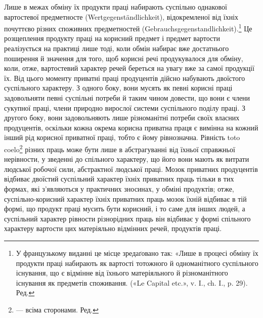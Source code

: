 Лише в межах обміну їх продукти праці набирають суспільно
однакової вартостевої предметносте (Wertgegenständlichkeit), відокремленої
від їхніх почуттєво різних споживних предметностей
(Gebrauchsgegenstandlichkeit).\footnote*{
У французькому виданні це місце зредаґовано так: «Лише в процесі
обміну їх продукти праці набирають як вартості тотожного й одноманітного
суспільного існування, що є відмінне від їхнього матеріяльного
й різноманітного існування як предметів споживання. («Le Capital
etc.», v. I., ch. I., p. 29). Ред.
} Це розщеплення продукту праці
на корисний предмет і предмет вартости реалізується на практиці
лише тоді, коли обмін набирає вже достатнього поширення й значення
для того, щоб корисні речі продукувалося для обміну, коли,
отже, вартостевий характер речей береться на увагу вже за самої
продукції їх. Від цього моменту приватні праці продуцентів
дійсно набувають двоїстого суспільного характеру. З одного боку,
вони мусять як певні корисні праці задовольняти певні суспільні
потреби й таким чином довести, що вони є члени сукупної праці,
члени природно вирослої системи суспільного поділу праці. З другого
боку, вони задовольняють лише різноманітні потреби своїх
власних продуцентів, оскільки кожна окрема корисна приватна
праця є вимінна на кожний інший рід корисної приватної праці,
тобто є йому рівнозначна. Рівність toto coelo\footnote*{
— всіма сторонами. Ред.
} різних праць може
бути лише в абстрагуванні від їхньої справжньої нерівности, у
зведенні до спільного характеру, що його вони мають як витрати
людської робочої сили, абстрактної людської праці. Мозок приватних
продуцентів відбиває двоїстий суспільний характер їхніх
приватних праць тільки в тих формах, які з’являються у практичних
зносинах, у обміні продуктів; отже, суспільно-корисний
характер їхніх приватних праць мозок їхній відбиває в тій формі,
що продукт праці мусить бути корисний, і то саме для інших
людей, а суспільний характер рівности різнорідних праць він
відбиває у формі спільного характеру вартости цих матеріяльно
відмінних речей, продуктів праці.


